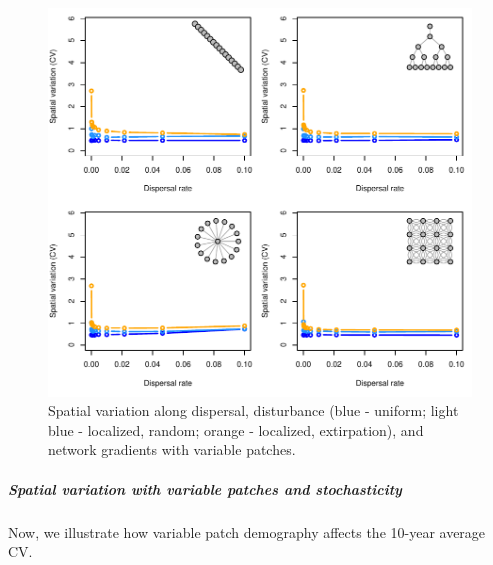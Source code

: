 \documentclass[]{article}
\let\oldsubparagraph\subparagraph
\renewcommand{\subparagraph}[1]{\oldsubparagraph{#1}\mbox{}}
\begin{document}
\begin{figure}[H]

{\centering \includegraphics{Managing_for_ecological_surprises_in_metapopulations_makeHTML_files/figure-latex/CV with variable patches-1} 

}

\caption{Spatial variation along dispersal, disturbance (blue - uniform; light blue - localized, random; orange - localized, extirpation), and network gradients with variable patches.}\label{fig:CV with variable patches}
\end{figure}

\subparagraph{Spatial variation with variable patches and
stochasticity}\label{spatial-variation-with-variable-patches-and-stochasticity}

Now, we illustrate how variable patch demography affects the 10-year
average CV.
\end{document}
